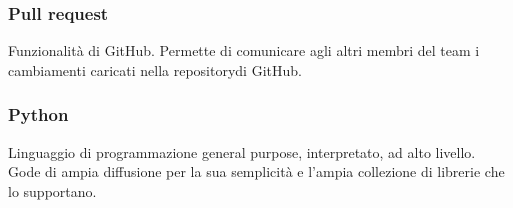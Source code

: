 \subsubsection*{Pull request}
Funzionalità di GitHub. Permette di comunicare agli altri membri del team i cambiamenti caricati nella repository\glosp di GitHub.

\subsubsection*{Python}
Linguaggio di programmazione general purpose, interpretato, ad alto livello. Gode di ampia diffusione per la sua semplicità e l'ampia collezione di librerie che lo supportano.

